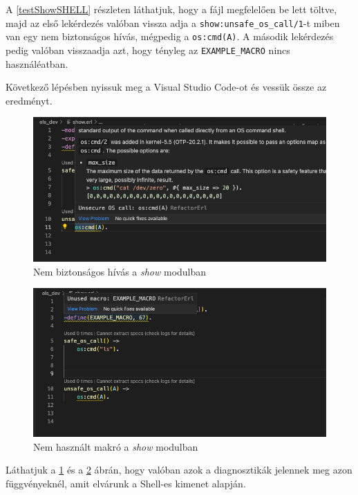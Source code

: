 A \ref{testShowSHELL} részleten láthatjuk, hogy a fájl megfelelően be lett töltve, majd az első lekérdezés valóban vissza adja a \lstinline{show:unsafe_os_call/1}-t miben van egy nem biztonságos hívás, mégpedig a \lstinline{os:cmd(A)}. A második lekérdezés pedig valóban visszaadja azt, hogy tényleg az \lstinline{EXAMPLE_MACRO} nincs használéatban.

\noindent Következő lépésben nyissuk meg a Visual Studio Code-ot és vessük össze az eredményt.

\begin{figure}[H]
  \centering
  \includegraphics[width=\linewidth]{images/testCases/showUnsecure.png}
  \caption{Nem biztonságos hívás a \textit{show} modulban}
  \label{fig:showUnsecure}
\end{figure}


\begin{figure}[H]
  \centering
  \includegraphics[width=\linewidth]{images/testCases/showMacro.png}
  \caption{Nem használt makró a \textit{show} modulban}
  \label{fig:showMacro}
\end{figure}

Láthatjuk a \ref{fig:showUnsecure} és a \ref{fig:showMacro} ábrán, hogy valóban azok a diagnosztikák jelennek meg azon függvényeknél, amit elvárunk a Shell-es kimenet alapján.

